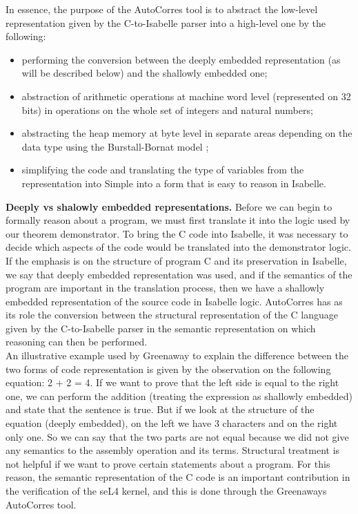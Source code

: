\documentclass[conference]{IEEEtran}
\begin{document}
In essence, the purpose of the AutoCorres tool is to abstract the low-level representation given by the C-to-Isabelle parser into a high-level one by the following:
\begin{itemize} 
    \item performing the conversion between the deeply embedded representation (as will be described below) and the shallowly embedded one;
    \item abstraction of arithmetic operations at machine word level (represented on 32 bits) in operations on the whole set of integers and natural numbers;
    \item abstracting the heap memory at byte level in separate areas depending on the data type using the Burstall-Bornat model \cite{burstall};
    \item simplifying the code and translating the type of variables from the representation into Simple into a form that is easy to reason in Isabelle.
\end{itemize}
\textbf{Deeply vs shalowly embedded representations.} Before we can begin to formally reason about a program, we must first translate it into the logic used by our theorem demonstrator. To bring the C code into Isabelle, it was necessary to decide which aspects of the code would be translated into the demonstrator logic. If the emphasis is on the structure of program C and its preservation in Isabelle, we say that deeply embedded representation was used, and if the semantics of the program are important in the translation process, then we have a shallowly embedded representation of the source code in Isabelle logic. AutoCorres has as its role the conversion between the structural representation of the C language given by the C-to-Isabelle parser in the semantic representation on which reasoning can then be performed.\\
An illustrative example used by Greenaway \cite{greenaway} to explain the difference between the two forms of code representation is given by the observation on the following equation: 2 + 2 = 4. If we want to prove that the left side is equal to the right one, we can perform the addition (treating the expression as shallowly embedded) and state that the sentence is true. But if we look at the structure of the equation (deeply embedded), on the left we have 3 characters and on the right only one. So we can say that the two parts are not equal because we did not give any semantics to the assembly operation and its terms. Structural treatment is not helpful if we want to prove certain statements about a program. For this reason, the semantic representation of the C code is an important contribution in the verification of the seL4 kernel, and this is done through the Greenaway\textquotesingle s AutoCorres tool.\\
\end{document}
